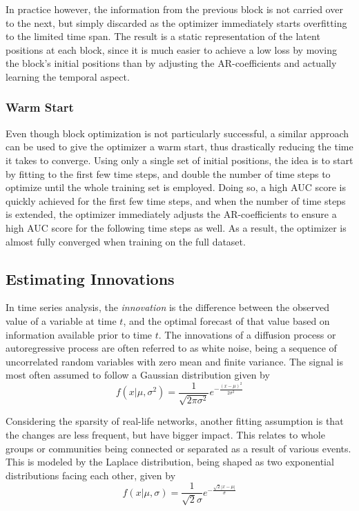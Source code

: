         In practice however, the information from the previous block is not carried over to the next, but simply discarded as the optimizer immediately starts overfitting to the limited time span. The result is a static representation of the latent positions at each block, since it is much easier to achieve a low loss by moving the block's initial positions than by adjusting the AR-coefficients and actually learning the temporal aspect.
        
    \subsubsection{Warm Start}
    
        Even though block optimization is not particularly successful, a similar approach can be used to give the optimizer a warm start, thus drastically reducing the time it takes to converge. Using only a single set of initial positions, the idea is to start by fitting to the first few time steps, and double the number of time steps to optimize until the whole training set is employed. Doing so, a high AUC score is quickly achieved for the first few time steps, and when the number of time steps is extended, the optimizer immediately adjusts the AR-coefficients to ensure a high AUC score for the following time steps as well. As a result, the optimizer is almost fully converged when training on the full dataset.
    
\subsection{Estimating Innovations}\label{sec:pyimpl-innovations}

    In time series analysis, the \emph{innovation} is the difference between the observed value of a variable at time $t$, and the optimal forecast of that value based on information available prior to time $t$. The innovations of a diffusion process or autoregressive process are often referred to as white noise, being a sequence of uncorrelated random variables with zero mean and finite variance. The signal is most often assumed to follow a Gaussian distribution given by
    \begin{equation}
        f(x\vert\mu,\sigma^2) = \frac{1}{\sqrt{2\pi\sigma^2}}e^{-\frac{(x-\mu)^2}{2\sigma^2}}
    \end{equation}
    
    Considering the sparsity of real-life networks, another fitting assumption is that the changes are less frequent, but have bigger impact. This relates to whole groups or communities being connected or separated as a result of various events. This is modeled by the Laplace distribution, being shaped as two exponential distributions facing each other, given by
    \begin{equation}
        f(x\vert\mu,\sigma)=\frac{1}{\sqrt{2}\sigma}e^{-\frac{\sqrt{2}|x-\mu|}{\sigma}}
    \end{equation}
    
